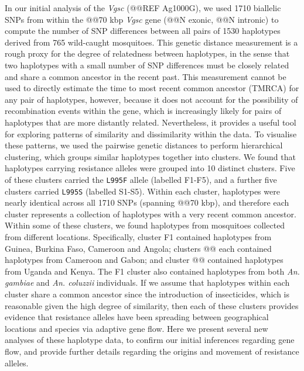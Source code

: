 \documentclass[a4paper,11pt,abstracton,hidelinks]{scrartcl}
\begin{document}
%
In our initial analysis of the \textit{Vgsc} (@@REF Ag1000G), we used 1710 biallelic SNPs from within the @@70 kbp \textit{Vgsc} gene (@@N exonic, @@N intronic) to compute the number of SNP differences between all pairs of 1530 haplotypes derived from 765 wild-caught mosquitoes.
%
This genetic distance measurement is a rough proxy for the degree of relatedness between haplotypes, in the sense that two haplotypes with a small number of SNP differences must be closely related and share a common ancestor in the recent past.
%
This measurement cannot be used to directly estimate the time to most recent common ancestor (TMRCA) for any pair of haplotypes, however, because it does not account for the possibility of recombination events within the gene, which is increasingly likely for pairs of haplotypes that are more distantly related.
%
Nevertheless, it provides a useful tool for exploring patterns of similarity and dissimilarity within the data.
%
To visualise these patterns, we used the pairwise genetic distances to perform hierarchical clustering, which groups similar haplotypes together into clusters.
%
We found that haplotypes carrying resistance alleles were grouped into 10 distinct clusters.
%
Five of these clusters carried the \texttt{L995F} allele (labelled F1-F5), and a further five clusters carried \texttt{L995S} (labelled S1-S5).
%
Within each cluster, haplotypes were nearly identical across all 1710 SNPs (spanning @@70 kbp), and therefore each cluster represents a collection of haplotypes with a very recent common ancestor.
%
Within some of these clusters, we found haplotypes from mosquitoes collected from different locations. 
%
Specifically, cluster F1 contained haplotypes from Guinea, Burkina Faso, Cameroon and Angola; clusters @@ each contained haplotypes from Cameroon and Gabon; and cluster @@ contained haplotypes from Uganda and Kenya.
%
The F1 cluster also contained haplotypes from both \textit{An. gambiae} and \textit{An. coluzzii} individuals.
%
If we assume that haplotypes within each cluster share a common ancestor since the introduction of insecticides, which is reasonable given the high degree of similarity, then each of these clusters provides evidence that resistance alleles have been spreading between geographical locations and species via adaptive gene flow.
%
Here we present several new analyses of these haplotype data, to confirm our initial inferences regarding gene flow, and provide further details regarding the origins and movement of resistance alleles.
%
\end{document}
